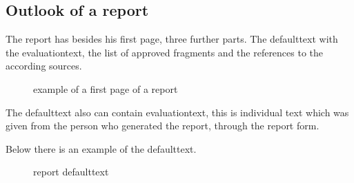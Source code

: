 \subsection{Outlook of a report}

The report has besides his first page, three further parts. The defaulttext with the evaluationtext, the list of approved fragments and the references to the according sources.

\begin{figure}[!h]
  \centering
  \caption{example of a first page of a report}
  \label{fig:report_deckblatt}
\end{figure}

\pagebreak

The defaulttext also can contain evaluationtext, this is individual text which was given from the person who generated the report, through the report form.
\pagebreak

Below there is an example of the defaulttext.

\begin{figure}[!h]
  \centering
  \caption{report defaulttext}
  \label{fig:report_default_evaluation_tex}
\end{figure}
\pagebreak

